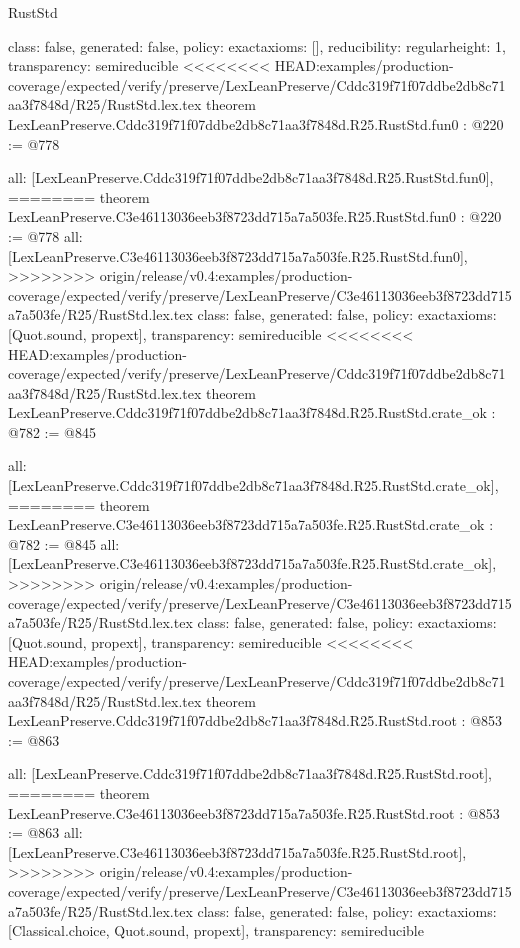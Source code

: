 \begin{lexlean}{RustStd}
\begin{coremodule}
{\begin{coremodule}
{{{  class: false,
  generated: false,
  policy: exact{axioms: []},
  reducibility: regular{height: 1},
  transparency: semireducible
}
<<<<<<<< HEAD:examples/production-coverage/expected/verify/preserve/LexLeanPreserve/Cddc319f71f07ddbe2db8c71aa3f7848d/R25/RustStd.lex.tex
theorem LexLeanPreserve.Cddc319f71f07ddbe2db8c71aa3f7848d.R25.RustStd.fun0 : @220 := @778 {
  all: [LexLeanPreserve.Cddc319f71f07ddbe2db8c71aa3f7848d.R25.RustStd.fun0],
========
theorem LexLeanPreserve.C3e46113036eeb3f8723dd715a7a503fe.R25.RustStd.fun0 : @220 := @778 {
  all: [LexLeanPreserve.C3e46113036eeb3f8723dd715a7a503fe.R25.RustStd.fun0],
>>>>>>>> origin/release/v0.4:examples/production-coverage/expected/verify/preserve/LexLeanPreserve/C3e46113036eeb3f8723dd715a7a503fe/R25/RustStd.lex.tex
  class: false,
  generated: false,
  policy: exact{axioms: [Quot.sound, propext]},
  transparency: semireducible
}
<<<<<<<< HEAD:examples/production-coverage/expected/verify/preserve/LexLeanPreserve/Cddc319f71f07ddbe2db8c71aa3f7848d/R25/RustStd.lex.tex
theorem LexLeanPreserve.Cddc319f71f07ddbe2db8c71aa3f7848d.R25.RustStd.crate_ok : @782 := @845 {
  all: [LexLeanPreserve.Cddc319f71f07ddbe2db8c71aa3f7848d.R25.RustStd.crate_ok],
========
theorem LexLeanPreserve.C3e46113036eeb3f8723dd715a7a503fe.R25.RustStd.crate_ok : @782 := @845 {
  all: [LexLeanPreserve.C3e46113036eeb3f8723dd715a7a503fe.R25.RustStd.crate_ok],
>>>>>>>> origin/release/v0.4:examples/production-coverage/expected/verify/preserve/LexLeanPreserve/C3e46113036eeb3f8723dd715a7a503fe/R25/RustStd.lex.tex
  class: false,
  generated: false,
  policy: exact{axioms: [Quot.sound, propext]},
  transparency: semireducible
}
<<<<<<<< HEAD:examples/production-coverage/expected/verify/preserve/LexLeanPreserve/Cddc319f71f07ddbe2db8c71aa3f7848d/R25/RustStd.lex.tex
theorem LexLeanPreserve.Cddc319f71f07ddbe2db8c71aa3f7848d.R25.RustStd.root : @853 := @863 {
  all: [LexLeanPreserve.Cddc319f71f07ddbe2db8c71aa3f7848d.R25.RustStd.root],
========
theorem LexLeanPreserve.C3e46113036eeb3f8723dd715a7a503fe.R25.RustStd.root : @853 := @863 {
  all: [LexLeanPreserve.C3e46113036eeb3f8723dd715a7a503fe.R25.RustStd.root],
>>>>>>>> origin/release/v0.4:examples/production-coverage/expected/verify/preserve/LexLeanPreserve/C3e46113036eeb3f8723dd715a7a503fe/R25/RustStd.lex.tex
  class: false,
  generated: false,
  policy: exact{axioms: [Classical.choice, Quot.sound, propext]},
  transparency: semireducible
}

}}}}}
\end{coremodule}}
\end{coremodule}
\end{lexlean}
